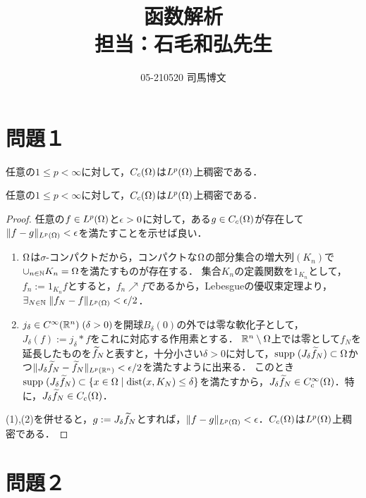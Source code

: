 \documentclass[uplatex,dvipdfmx]{jsarticle}
\title{函数解析\\担当：石毛和弘先生}
\author{05-210520 司馬博文}
\begin{document}
\maketitle

\section{問題１}

\begin{tcolorbox}[colframe=ForestGreen, colback=ForestGreen!10!white,breakable,colbacktitle=ForestGreen!40!white,coltitle=black,fonttitle=\bfseries\sffamily,
title=]
    任意の$1\le p<\infty$に対して，$C_c(\Omega)$は$L^p(\Omega)$上稠密である．
\end{tcolorbox}

\begin{proposition}\label{prop-dense-subspace-C_c-in-Lp}
    任意の$1\le p<\infty$に対して，$C_c(\Omega)$は$L^p(\Omega)$上稠密である．
\end{proposition}
\begin{proof}
    任意の$f\in L^p(\Omega)$と$\epsilon>0$に対して，ある$g\in C_c(\Omega)$が存在して$\|f-g\|_{L^p(\Omega)}<\epsilon$を満たすことを示せば良い．
    \begin{enumerate}
        \item $\Omega$は$\sigma$-コンパクトだから，コンパクトな$\Omega$の部分集合の増大列$(K_n)$で$\cup_{n\in\mathbb{N}}K_n=\Omega$を満たすものが存在する．
        集合$K_n$の定義関数を$1_{K_n}$として，$f_n:=1_{K_n}f$とすると，$f_n\nearrow f$であるから，Lebesgueの優収束定理より，$\exists_{N\in\mathbb{N}}\;\|f_N-f\|_{L^p(\Omega)}<\epsilon/2$．
        \item $j_\delta\in C^\infty(\mathbb{R}^n)\;(\delta>0)$を開球$B_\delta(0)$の外では零な軟化子として，$J_\delta(f):=j_\delta *f$をこれに対応する作用素とする．
        $\mathbb{R}^n\setminus\Omega$上では零として$f_N$を延長したものを$\widetilde{f}_N$と表すと，十分小さい$\delta>0$に対して，$\mathrm{supp}\;(J_\delta\widetilde{f}_N)\subset\Omega$かつ$\|J_\delta\widetilde{f}_N-\widetilde{f}_N\|_{L^p(\mathbb{R}^n)}<\epsilon/2$を満たすように出来る．
        このとき$\mathrm{supp}\;(J_\delta\widetilde{f}_N)\subset\left\{x\in\Omega\mid \mathrm{dist}(x,K_N)\le\delta\right\}$を満たすから，$J_\delta\widetilde{f}_N\in C_c^\infty(\Omega)$．特に，$J_\delta\widetilde{f}_N\in C_c(\Omega)$．
    \end{enumerate}
    (1),(2)を併せると，$g:=J_\delta\widetilde{f}_N$とすれば，$\|f-g\|_{L^p(\Omega)}<\epsilon$．$C_c(\Omega)$は$L^p(\Omega)$上稠密である．
\end{proof}

\section{問題２}
\end{document}
